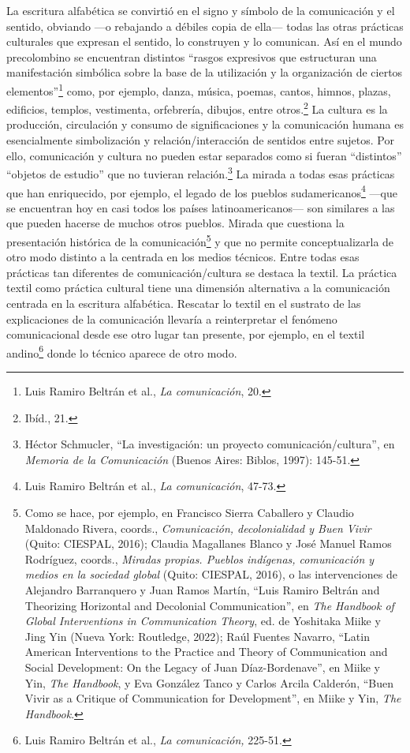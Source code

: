 \documentclass{tufte-handout}
\begin{document}
La escritura alfabética se convirtió en el signo y símbolo de la
comunicación y el sentido, obviando ---o rebajando a débiles copia de
ella--- todas las otras prácticas culturales que expresan el sentido, lo
construyen y lo comunican. Así en el mundo precolombino se encuentran
distintos ``rasgos expresivos que estructuran una manifestación
simbólica sobre la base de la utilización y la organización de ciertos
elementos''\footnote{Luis Ramiro Beltrán et al., \emph{La comunicación},
  20.} como, por ejemplo, danza, música, poemas, cantos, himnos, plazas,
edificios, templos, vestimenta, orfebrería, dibujos, entre
otros.\footnote{Ibíd., 21.} La cultura es la producción, circulación y
consumo de significaciones y la comunicación humana es esencialmente
simbolización y relación/interacción de sentidos entre sujetos. Por
ello, comunicación y cultura no pueden estar separados como si fueran
``distintos'' ``objetos de estudio'' que no tuvieran
relación.\footnote{Héctor Schmucler, ``La investigación: un proyecto
  comunicación/cultura'', en \emph{Memoria de la Comunicación} (Buenos
  Aires: Biblos, 1997): 145-51.} La mirada a todas esas prácticas que
han enriquecido, por ejemplo, el legado de los pueblos
sudamericanos\footnote{Luis Ramiro Beltrán et al., \emph{La
  comunicación}, 47-73.} ---que se encuentran hoy en casi todos los
países latinoamericanos--- son similares a las que pueden hacerse de
muchos otros pueblos. Mirada que cuestiona la presentación histórica de
la comunicación\footnote{Como se hace, por ejemplo, en Francisco Sierra
  Caballero y Claudio Maldonado Rivera, coords., \emph{Comunicación,
  decolonialidad y Buen Vivir} (Quito: CIESPAL, 2016); Claudia
  Magallanes Blanco y José Manuel Ramos Rodríguez, coords.,
  \emph{Miradas propias. Pueblos indígenas, comunicación y medios en la
  sociedad global} (Quito: CIESPAL, 2016), o las intervenciones de
  Alejandro Barranquero y Juan Ramos Martín, ``Luis Ramiro Beltrán and
  Theorizing Horizontal and Decolonial Communication'', en \emph{The
  Handbook of Global Interventions in Communication Theory}, ed. de
  Yoshitaka Miike y Jing Yin (Nueva York: Routledge, 2022); Raúl Fuentes
  Navarro, ``Latin American Interventions to the Practice and Theory of
  Communication and Social Development: On the Legacy of Juan
  Díaz-Bordenave'', en Miike y Yin, \emph{The Handbook}, y Eva González
  Tanco y Carlos Arcila Calderón, ``Buen Vivir as a Critique of
  Communication for Development'', en Miike y Yin, \emph{The Handbook}.}
y que no permite conceptualizarla de otro modo distinto a la centrada en
los medios técnicos. Entre todas esas prácticas tan diferentes de
comunicación/cultura se destaca la textil. La práctica textil como
práctica cultural tiene una dimensión alternativa a la comunicación
centrada en la escritura alfabética. Rescatar lo textil en el sustrato
de las explicaciones de la comunicación llevaría a reinterpretar el
fenómeno comunicacional desde ese otro lugar tan presente, por ejemplo,
en el textil andino\footnote{Luis Ramiro Beltrán et al., \emph{La
  comunicación,} 225-51.} donde lo técnico aparece de otro modo.
\end{document}

